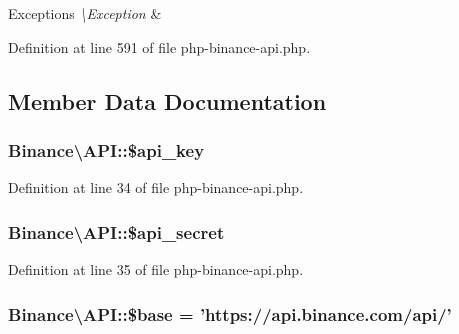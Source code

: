 \begin{DoxyExceptions}{Exceptions}
{\em \textbackslash{}\-Exception} & \\
\hline
\end{DoxyExceptions}


Definition at line 591 of file php-\/binance-\/api.\-php.



\subsection{Member Data Documentation}
\hypertarget{classBinance_1_1API_a4b70fc1796d52440e44423da2cbafca5}{
\subsubsection[{\$api\-\_\-key}]{\setlength{\rightskip}{0pt plus 5cm}Binance\textbackslash{}\-A\-P\-I\-::\$api\-\_\-key\hspace{0.3cm}{\ttfamily [protected]}}}\label{classBinance_1_1API_a4b70fc1796d52440e44423da2cbafca5}


Definition at line 34 of file php-\/binance-\/api.\-php.

\hypertarget{classBinance_1_1API_a5612f3068ec5843031812893537e7677}{
\subsubsection[{\$api\-\_\-secret}]{\setlength{\rightskip}{0pt plus 5cm}Binance\textbackslash{}\-A\-P\-I\-::\$api\-\_\-secret\hspace{0.3cm}{\ttfamily [protected]}}}\label{classBinance_1_1API_a5612f3068ec5843031812893537e7677}


Definition at line 35 of file php-\/binance-\/api.\-php.

\hypertarget{classBinance_1_1API_ac863e52396757997d84e6783b5336828}{
\subsubsection[{\$base}]{\setlength{\rightskip}{0pt plus 5cm}Binance\textbackslash{}\-A\-P\-I\-::\$base = 'https\-://api.\-binance.\-com/api/'\hspace{0.3cm}{\ttfamily [protected]}}}\label{classBinance_1_1API_ac863e52396757997d84e6783b5336828}


